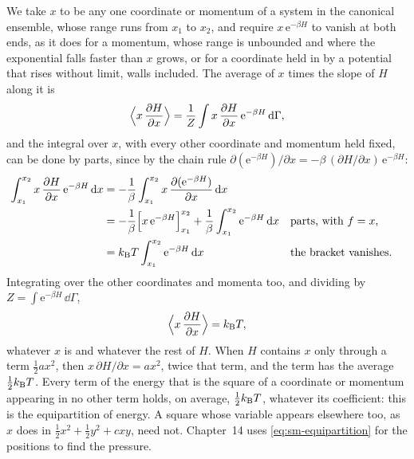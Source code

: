 We take $x$ to be any one coordinate or momentum of a system in the
canonical ensemble, whose range runs from $x_1$ to $x_2$, and require
$x\,\mathrm{e}^{-\beta H}$ to vanish at both ends, as it does for a
momentum, whose range is unbounded and where the exponential falls faster
than $x$ grows, or for a coordinate held in by a potential that rises
without limit, walls included. The average of $x$ times the slope of $H$
along it is
\begin{equation*}
   \Bigl\langle x\,\frac{\partial H}{\partial x}\Bigr\rangle
   = \frac1Z\int x\,\frac{\partial H}{\partial x}\,\mathrm{e}^{-\beta H}
   \,\mathrm{d}\Gamma ,
\end{equation*}
and the integral over $x$, with every other coordinate and momentum held
fixed, can be done by parts, since by the chain rule
$\partial(\mathrm{e}^{-\beta H})/\partial x = -\beta\,(\partial H/\partial
x)\,\mathrm{e}^{-\beta H}$:
\begin{align*}
   \int_{x_1}^{x_2}x\,\frac{\partial H}{\partial x}\,\mathrm{e}^{-\beta H}
   \,\mathrm{d} x
   &= -\frac1\beta\int_{x_1}^{x_2}x\,\frac{\partial(\mathrm{e}^{-\beta H})}
   {\partial x}\,\mathrm{d} x\\
   &= -\frac1\beta\Bigl[x\,\mathrm{e}^{-\beta H}\Bigr]_{x_1}^{x_2}
   + \frac1\beta\int_{x_1}^{x_2}\mathrm{e}^{-\beta H}\,\mathrm{d} x
   && \text{parts, with $f = x$,}\\
   &= k_{\mathrm{B}} T\int_{x_1}^{x_2}\mathrm{e}^{-\beta H}\,\mathrm{d} x
   && \text{the bracket vanishes.}
\end{align*}
Integrating over the other coordinates and momenta too, and dividing by
$Z = \int\mathrm{e}^{-\beta H}\,\dd\Gamma$,
\begin{equation}
   \Bigl\langle x\,\frac{\partial H}{\partial x}\Bigr\rangle = k_{\mathrm{B}} T ,
   \label{eq:sm-equipartition}
\end{equation}
whatever $x$ is and whatever the rest of $H$. When $H$ contains $x$ only
through a term $\frac12ax^2$, then $x\,\partial H/\partial x = ax^2$, twice
that term, and the term has the average $\frac12k_{\mathrm{B}} T$. Every term of the
energy that is the square of a coordinate or momentum appearing in no
other term holds, on average, $\frac12k_{\mathrm{B}} T$, whatever its coefficient:
this is the equipartition of energy. A square whose variable appears
elsewhere too, as $x$ does in $\frac12x^2 + \frac12y^2 + cxy$, need not. Chapter~14 uses \cref{eq:sm-equipartition} for the positions to
find the pressure.

